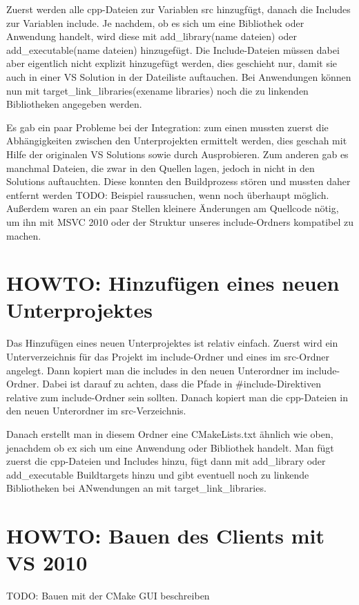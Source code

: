 Zuerst werden alle cpp-Dateien zur Variablen src hinzugfügt, danach die
Includes zur Variablen include. Je nachdem, ob es sich um eine Bibliothek oder
Anwendung handelt, wird diese mit add\_library(name dateien) oder
add\_executable(name dateien) hinzugefügt. Die Include-Dateien müssen dabei
aber eigentlich nicht explizit hinzugefügt werden, dies geschieht nur, damit
sie auch in einer VS Solution in der Dateiliste auftauchen. Bei Anwendungen
können nun mit target\_link\_libraries(exename libraries) noch die zu linkenden
Bibliotheken angegeben werden.

Es gab ein paar Probleme bei der Integration: zum einen mussten zuerst die
Abhängigkeiten zwischen den Unterprojekten ermittelt werden, dies geschah mit
Hilfe der originalen VS Solutions sowie durch Ausprobieren. Zum anderen gab es
manchmal Dateien, die zwar in den Quellen lagen, jedoch in nicht in den
Solutions auftauchten. Diese konnten den Buildprozess stören und mussten daher
entfernt werden TODO: Beispiel raussuchen, wenn noch überhaupt möglich.
Außerdem waren an ein paar Stellen kleinere Änderungen am Quellcode nötig, um
ihn mit MSVC 2010 oder der Struktur unseres include-Ordners kompatibel zu machen.

\section{HOWTO: Hinzufügen eines neuen Unterprojektes}
Das Hinzufügen eines neuen Unterprojektes ist relativ einfach.
Zuerst wird ein Unterverzeichnis für das Projekt im include-Ordner und eines im
src-Ordner angelegt. Dann kopiert man die includes in den neuen Unterordner im
include-Ordner. Dabei ist darauf zu achten, dass die Pfade in
\#include-Direktiven relative zum include-Ordner sein sollten. Danach kopiert
man die cpp-Dateien in den neuen Unterordner im src-Verzeichnis.

Danach erstellt man in diesem Ordner eine CMakeLists.txt ähnlich wie oben,
jenachdem ob ex sich um eine Anwendung oder Bibliothek handelt. Man fügt zuerst
die cpp-Dateien und Includes hinzu, fügt dann mit add\_library oder
add\_executable Buildtargets hinzu und gibt eventuell noch zu linkende
Bibliotheken bei ANwendungen an mit target\_link\_libraries.

\section{HOWTO: Bauen des Clients mit VS 2010}
TODO: Bauen mit der CMake GUI beschreiben
